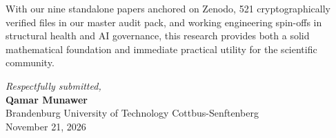 \documentclass[11pt,a4paper]{article}
\begin{document}
With our nine standalone papers anchored on Zenodo, 521 cryptographically verified files in our master audit pack, and working engineering spin-offs in structural health and AI governance, this research provides both a solid mathematical foundation and immediate practical utility for the scientific community.

\vspace{0.8cm}
\begin{flushright}
\textit{Respectfully submitted,}\\
\textbf{Qamar Munawer}\\
Brandenburg University of Technology Cottbus-Senftenberg\\
November 21, 2026
\end{flushright}
\end{document}
